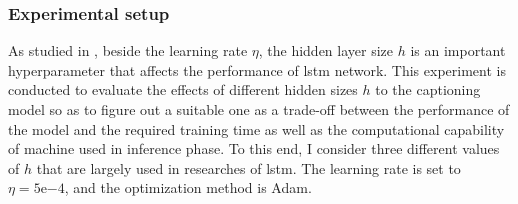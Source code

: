 \begin{itemize}
\subsubsection{Experimental setup}
As studied in \cite{DBLP:journals/corr/GreffSKSS15}, beside the learning rate $\eta$, the hidden layer size $h$ is an important hyperparameter that affects the performance of \gls{lstm} network. 
This experiment is conducted to evaluate the effects of different hidden sizes $h$ to the captioning model so as to figure out a suitable one as a trade-off between the performance of the model and the required training time as well as the computational capability of machine used in inference phase.
To this end, I consider three different values of $h$ that are largely used in researches of \gls{lstm}. %
The learning rate is set to $\eta = 5\mathrm{e}{-4}$, and the optimization method is Adam.


\end{itemize}
